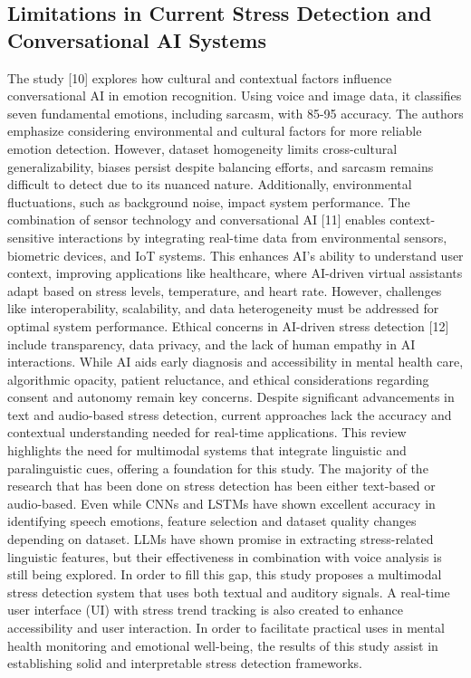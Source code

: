 \documentclass[a4j, twocolumn]{article}
\begin{document}
  \subsection{Limitations in Current Stress Detection and Conversational AI Systems}
  The study [10] explores how cultural and contextual factors influence conversational AI in emotion recognition. Using voice and image data, it classifies seven fundamental emotions, including sarcasm, with 85-95 accuracy. The authors emphasize considering environmental and cultural factors for more reliable emotion detection. However, dataset homogeneity limits cross-cultural generalizability, biases persist despite balancing efforts, and sarcasm remains difficult to detect due to its nuanced nature. Additionally, environmental fluctuations, such as background noise, impact system performance.
The combination of sensor technology and conversational AI [11] enables context-sensitive interactions by integrating real-time data from environmental sensors, biometric devices, and IoT systems. This enhances AI’s ability to understand user context, improving applications like healthcare, where AI-driven virtual assistants adapt based on stress levels, temperature, and heart rate. However, challenges like interoperability, scalability, and data heterogeneity must be addressed for optimal system performance.
Ethical concerns in AI-driven stress detection [12] include transparency, data privacy, and the lack of human empathy in AI interactions. While AI aids early diagnosis and accessibility in mental health care, algorithmic opacity, patient reluctance, and ethical considerations regarding consent and autonomy remain key concerns. 
Despite significant advancements in text and audio-based stress detection, current approaches lack the accuracy and contextual understanding needed for real-time applications. This review highlights the need for multimodal systems that integrate linguistic and paralinguistic cues, offering a foundation for this study.
The majority of the research that has been done on stress detection has been either text-based or audio-based. Even while CNNs and LSTMs have shown excellent accuracy in identifying speech emotions, feature selection and dataset quality changes depending on dataset. LLMs have shown promise in extracting stress-related linguistic features, but their effectiveness in combination with voice analysis is still being explored. In order to fill this gap, this study proposes a multimodal stress detection system that uses both textual and auditory signals. A real-time user interface (UI) with stress trend tracking is also created to enhance accessibility and user interaction. In order to facilitate practical uses in mental health monitoring and emotional well-being, the results of this study assist in establishing solid and interpretable stress detection frameworks.
\end{document}
